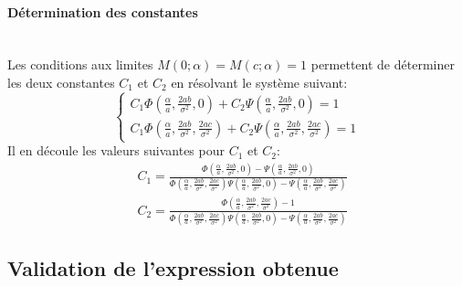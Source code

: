 \paragraph{Détermination des constantes}\phantom{}\\
Les conditions aux limites $M(0;\alpha)=M(c;\alpha)=1$ permettent de déterminer les deux constantes $C_1$ et $C_2$ en résolvant le système suivant:
\[
\begin{cases}
    C_1\Phi\left(\frac{\alpha}{a}, \frac{2ab}{\sigma^2}, 0\right) + C_2\Psi\left(\frac{\alpha}{a}, \frac{2ab}{\sigma^2}, 0\right) = 1 \\
C_1\Phi\left(\frac{\alpha}{a}, \frac{2ab}{\sigma^2}, \frac{2ac}{\sigma^2}\right) + C_2\Psi\left(\frac{\alpha}{a}, \frac{2ab}{\sigma^2}, \frac{2ac}{\sigma^2}\right) = 1
\end{cases}
\]
Il en découle les valeurs suivantes pour $C_1$ et $C_2$: 
\begin{equation}\label{fgm_constants}
    \begin{aligned}
        &C_1 = \frac{\Phi(\frac{\alpha}{a}, \frac{2ab}{\sigma^2}, 0)-\Psi(\frac{\alpha}{a}, \frac{2ab}{\sigma^2}, 0)}{\Phi(\frac{\alpha}{a}, \frac{2ab}{\sigma^2}, \frac{2ac}{\sigma^2})\Psi(\frac{\alpha}{a}, \frac{2ab}{\sigma^2}, 0)-\Psi(\frac{\alpha}{a}, \frac{2ab}{\sigma^2}, \frac{2ac}{\sigma^2})} \\
        &C_2 = \frac{\Phi(\frac{\alpha}{a}, \frac{2ab}{\sigma^2}, \frac{2ac}{\sigma^2})-1}{\Phi(\frac{\alpha}{a}, \frac{2ab}{\sigma^2}, \frac{2ac}{\sigma^2})\Psi(\frac{\alpha}{a}, \frac{2ab}{\sigma^2}, 0)-\Psi(\frac{\alpha}{a}, \frac{2ab}{\sigma^2}, \frac{2ac}{\sigma^2})}
    \end{aligned}
\end{equation}
\subsection{Validation de l'expression obtenue}
